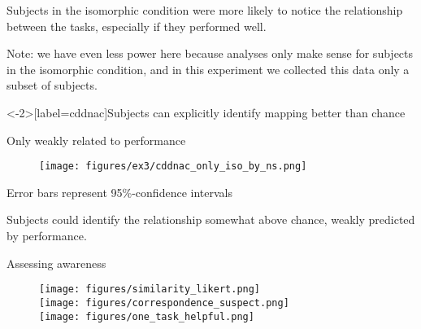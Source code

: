 \documentclass{beamer}
\begin{document}
\begin{frame}[standout]
Subjects in the isomorphic condition were more likely to notice the relationship between the tasks, especially if they performed well.
\end{frame}


\begin{frame}
Note: we have even less power here because analyses only make sense for subjects in the isomorphic condition, and in this experiment we collected this data only a subset of subjects.
\end{frame}

\begin{frame}<-2>[label=cddnac]{Subjects can explicitly identify mapping better than chance}
\begin{figure}
\centering
{}   
\end{figure}
\end{frame}

\begin{frame}{Only weakly related to performance}
\begin{figure}
\centering
    \texttt{[image: figures/ex3/cddnac\_only\_iso\_by\_ns.png]}
\end{figure}
{\scriptsize Error bars represent 95\%-confidence intervals}
\end{frame}

\begin{frame}[standout]
Subjects could identify the relationship somewhat above chance, weakly predicted by performance.
\end{frame}


\begin{frame}{Assessing awareness}
\begin{figure}
\centering
\texttt{[image: figures/similarity\_likert.png]}\\
\texttt{[image: figures/correspondence\_suspect.png]}\\
\texttt{[image: figures/one\_task\_helpful.png]}
\end{figure}
\end{frame}
\end{document}
